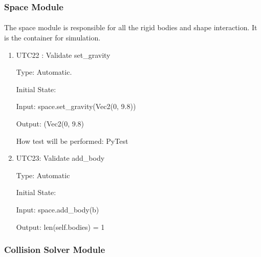 \documentclass[12pt, titlepage]{article}
\begin{document}
\subsubsection{Space Module}

\paragraph{}
The space module is responsible for all the rigid bodies and shape interaction. It is the container for simulation.
\begin{enumerate}
	
	
	\item{UTC22} {: Validate set\_gravity \\}
	
	Type: Automatic.
	
	Initial State: 
	
	Input: space.set\_gravity(Vec2(0, 9.8))
	
	Output: (Vec2(0, 9.8)
	
	How test will be performed: PyTest 
	
	\item{UTC23}{: Validate add\_body\\}
	
	Type: Automatic
	
	Initial State: 
	
	Input: space.add\_body(b)
	
	Output: len(self.bodies) = 1
	

	\end{enumerate}

\subsubsection{Collision Solver Module}
\end{document}
